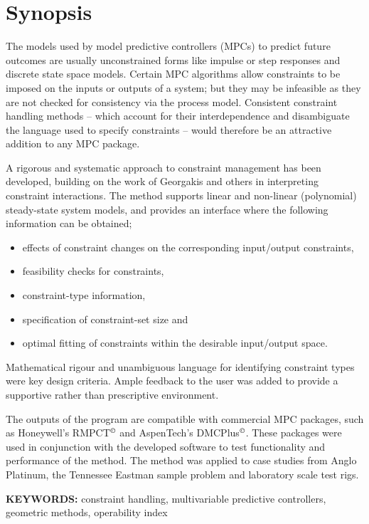 \chapter*{Synopsis}
The models used by model predictive controllers (MPCs) to predict future 
outcomes are usually unconstrained forms like impulse or step responses 
and discrete state space models. Certain MPC algorithms allow constraints
 to be imposed on the inputs or outputs of a system; but they may be 
infeasible as they are not checked for consistency via the process model.
 Consistent constraint handling methods -- which account for their 
interdependence and disambiguate the language used to specify constraints
 -- would therefore be an attractive addition to any MPC package.

A rigorous and systematic approach to constraint management has been 
developed, building on the work of Georgakis and others in interpreting 
constraint interactions. The method supports linear and non-linear 
(polynomial) steady-state system models, and provides an interface where 
the following information can be obtained;
\begin{itemize}
  \item effects of constraint changes on the corresponding input/output 
    constraints,
  \item feasibility checks for constraints,
  \item constraint-type information,
  \item specification of constraint-set size and
  \item optimal fitting of constraints within the desirable input/output 
    space.
\end{itemize}
Mathematical rigour and unambiguous language for identifying constraint 
types were key design criteria. Ample feedback to the user was added to 
provide a supportive rather than prescriptive environment.

The outputs of the program are compatible with commercial MPC packages, 
such as Honeywell’s RMPCT$^{\copyright}$ and AspenTech’s 
DMCPlus$^{\copyright}$. These packages were used in conjunction with the 
developed software to test functionality and performance of the method. 
The method was applied to case studies from Anglo Platinum, the Tennessee 
Eastman sample problem and laboratory scale test rigs.
\bigskip

\noindent \textbf{KEYWORDS:} constraint handling, multivariable predictive
controllers, geometric methods, operability index

